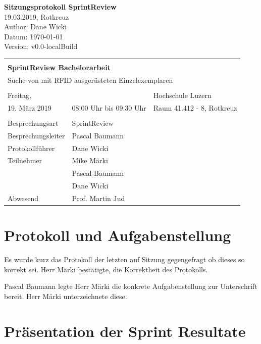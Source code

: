 \documentclass[parskip=full, a4paper]{scrreprt}
\providecommand{\docversion}{0.0-localBuild}
\begin{document}
\begin{titlepage}
\vspace*{2.5cm}
\noindent
\Huge{\textbf{Sitzungsprotokoll SprintReview}} \\
\noindent
\Large{19.03.2019, Rotkreuz}\\
\vfill
\noindent
\large{Author: Dane Wicki}\\
\noindent
\large{Datum: \today}\\
\noindent
\large{Version: v\docversion}
\end{titlepage}

\noindent
\begin{tabularx}{\textwidth}{XXl}
\hline \\
\multicolumn{3}{l}{\Large{\textbf{SprintReview  Bachelorarbeit}}}\\
\multicolumn{3}{l}{Suche von mit RFID ausgerüsteten Einzelexemplaren} \\ \\
\hline
	Freitag, & & Hochschule Luzern \\
	19. März 2019 & 08:00 Uhr bis 09:30 Uhr & Raum 41.412 - 8, Rotkreuz \\
\hline \\
\hline
Besprechungsart & SprintReview & \\
\hline
Besprechungsleiter & Pascal Baumann & \\
\hline
Protokollführer & Dane Wicki & \\
\hline
Teilnehmer & Mike Märki & \\ & Pascal Baumann & \\ & Dane Wicki & \\
\hline
Abwesend & Prof. Martin Jud & \\
\hline
\end{tabularx}

	\noindent

\tableofcontents
\clearpage
\chapter{Protokoll und Aufgabenstellung}

Es wurde kurz das Protokoll der letzten auf Sitzung gegengefragt ob dieses so korrekt sei. Herr Märki bestätigte, die Korrektheit des Protokolls.

Pascal Baumann legte Herr Märki die konkrete Aufgabenstellung zur Unterschrift bereit. Herr Märki unterzeichnete diese.

\chapter{Präsentation der Sprint Resultate}
\end{document}
